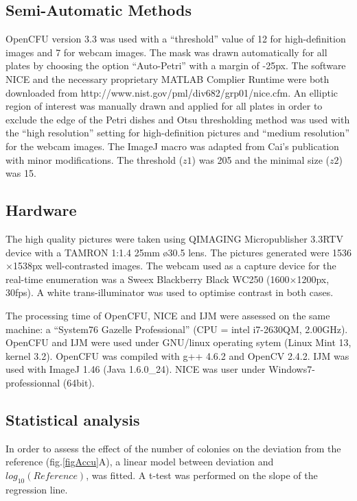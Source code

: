 \documentclass[10pt]{article}
\newcommand{\IJM}{IJM}
\begin{document}
\subsection*{Semi-Automatic Methods} 

OpenCFU version 3.3 was used with a ``threshold'' value of 12 for high-definition images and 7 for webcam images.
The mask was drawn automatically for all plates by choosing the option ``Auto-Petri'' with a margin of -25px. 
The software NICE and the necessary proprietary MATLAB Complier Runtime were both downloaded from
http://www.nist.gov/pml/div682/grp01/nice.cfm.
An elliptic region of interest was manually drawn and applied for all plates
in order to exclude the edge of the Petri dishes and Otsu thresholding method
was used with the ``high resolution'' setting for high-definition pictures and ``medium resolution'' for the webcam images.
The ImageJ macro was adapted from Cai's publication\cite{cai_optimized_2011} with minor modifications.
The threshold ($z1$) was 205 and the minimal size ($z2$) was 15.


\subsection*{Hardware} 
The high quality pictures were taken using QIMAGING Micropublisher 3.3RTV
device with a TAMRON 1:1.4 25mm \o 30.5 lens. The pictures generated were
1536$\times{}$1538px well-contrasted images.
The webcam used as a capture device for the real-time enumeration was a Sweex
Blackberry Black WC250 (1600$\times{}$1200px, 30fps).
A white trans-illuminator was used to optimise contrast in both cases.

The processing time of OpenCFU, NICE and \IJM{} were assessed on the same
machine: a ``System76 Gazelle Professional'' (CPU = intel i7-2630QM,
2.00GHz).
OpenCFU and \IJM{} were used under GNU/linux operating sytem (Linux Mint 13, kernel
3.2).
OpenCFU was compiled with g++ 4.6.2 and OpenCV 2.4.2.
\IJM{} was used with ImageJ 1.46 (Java 1.6.0\_24).
NICE was user under Windows7-professionnal (64bit).

\subsection*{Statistical analysis} 
In order to assess the effect of the
number of colonies on the deviation from the reference (fig.\ref{figAccu}A), a
linear model between deviation and $log_{10} (Reference)$, was fitted.  A t-test
was performed on the slope of the regression line.
\end{document}
